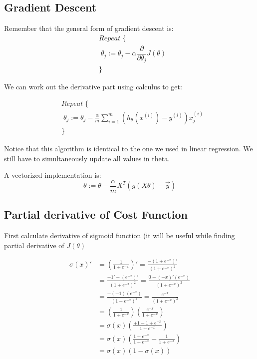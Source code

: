 \subsection{Gradient Descent}
Remember that the general form of gradient descent is:
\begin{align*}
& Repeat \; \lbrace \\ 
& \; \theta_j := \theta_j - \alpha \dfrac{\partial}{\partial \theta_j}J(\theta) \\ 
& \rbrace
\end{align*}

We can work out the derivative part using calculus to get:

\begin{align*}
& Repeat \; \lbrace \\
& \; \theta_j := \theta_j - \frac{\alpha}{m} \sum_{i=1}^m (h_\theta(x^{(i)}) - y^{(i)}) x_j^{(i)} \\ & \rbrace
\end{align*}

Notice that this algorithm is identical to the one we used in linear regression. We still have to simultaneously update all values in theta.

A vectorized implementation is:
\[\theta := \theta - \frac{\alpha}{m} X^{T} (g(X \theta ) - \vec{y}) \]

\subsection{Partial derivative of Cost Function}

First calculate derivative of sigmoid function (it will be useful while finding partial derivative of $J(\theta)$

{\small
\begin{align*}
\sigma(x)'
&=\left(\frac{1}{1+e^{-x}}\right)'=\frac{-(1+e^{-x})'}{(1+e^{-x})^2}\\
&=\frac{-1'-(e^{-x})'}{(1+e^{-x})^2}=\frac{0-(-x)'(e^{-x})}{(1+e^{-x})^2}\\
&=\frac{-(-1)(e^{-x})}{(1+e^{-x})^2}=\frac{e^{-x}}{(1+e^{-x})^2} \\ 
&=\left(\frac{1}{1+e^{-x}}\right)\left(\frac{e^{-x}}{1+e^{-x}}\right)\\
&=\sigma(x)\left(\frac{+1-1 + e^{-x}}{1+e^{-x}}\right)\\
&=\sigma(x)\left(\frac{1 + e^{-x}}{1+e^{-x}} - \frac{1}{1+e^{-x}}\right)\\
&=\sigma(x)(1 - \sigma(x))
\end{align*}
}

